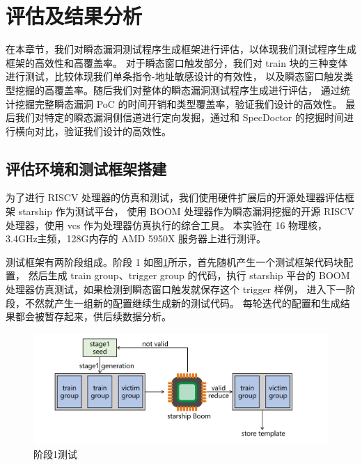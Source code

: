 \cleardoublepage
\section{评估及结果分析}

在本章节，我们对瞬态漏洞测试程序生成框架进行评估，以体现我们测试程序生成框架的高效性和高覆盖率。
对于瞬态窗口触发部分，我们对 train 块的三种变体进行测试，比较体现我们单条指令-地址敏感设计的有效性，
以及瞬态窗口触发类型挖掘的高覆盖率。随后我们对整体的瞬态漏洞测试程序生成进行评估，
通过统计挖掘完整瞬态漏洞 PoC 的时间开销和类型覆盖率，验证我们设计的高效性。
最后我们对特定的瞬态漏洞侧信道进行定向发掘，通过和 SpecDoctor 的挖掘时间进行横向对比，验证我们设计的高效性。\par

\subsection{评估环境和测试框架搭建}

为了进行 RISCV 处理器的仿真和测试，我们使用硬件扩展后的开源处理器评估框架 starship 作为测试平台，
使用 BOOM 处理器作为瞬态漏洞挖掘的开源 RISCV 处理器，使用 vcs 作为处理器仿真执行的综合工具。
本实验在 16 物理核，3.4GHz主频，128G内存的 AMD 5950X 服务器上进行测评。\par

测试框架有两阶段组成。阶段 1 如图\ref{paper:stage1-test}所示，首先随机产生一个测试框架代码块配置，
然后生成 train group、trigger group 的代码，执行 starship 平台的
BOOM 处理器仿真测试，如果检测到瞬态窗口触发就保存这个 trigger 样例，
进入下一阶段，不然就产生一组新的配置继续生成新的测试代码。
每轮迭代的配置和生成结果都会被暂存起来，供后续数据分析。\par

\begin{figure}[!h]
    \centering
    \includegraphics[width=\linewidth]{figure/paper/stage1-test.png}
    \caption{阶段1测试}
    \label{paper:stage1-test}
\end{figure}


